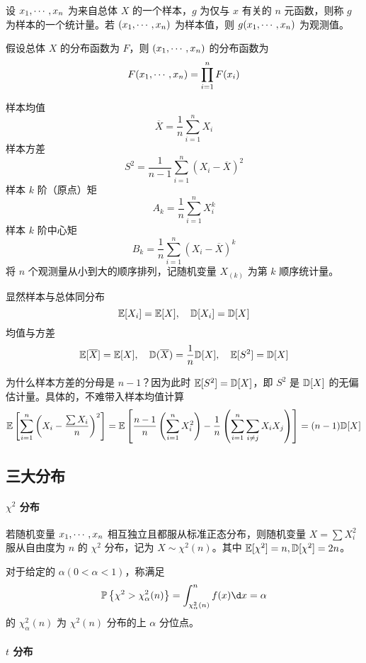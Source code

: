 设 $x_1,\cdots,x_n$ 为来自总体 $X$ 的一个样本，$g$ 为仅与 $x$ 有关的 $n$ 元函数，则称 $g$ 为样本的一个统计量。若 $(x_1,\cdots,x_n)$ 为样本值，则 $g(x_1,\cdots,x_n)$ 为观测值。

假设总体 $X$ 的分布函数为 $F$，则 $(x_1,\cdots,x_n)$ 的分布函数为
\[ F(x_1,\cdots,x_n) = \prod_{i=1}^n F(x_i) \]

样本均值
\[ \overline{X} = \frac{1}{n} \sum_{i=1}^n X_i \]
样本方差
\[ S^2 = \frac{1}{n-1} \sum_{i=1}^n (X_i - \overline{X})^2 \]
样本 $k$ 阶（原点）矩
\[ A_k = \frac{1}{n} \sum_{i=1}^n X_i^k \]
样本 $k$ 阶中心矩
\[ B_k = \frac{1}{n} \sum_{i=1}^n (X_i - \overline{X})^k \]
将 $n$ 个观测量从小到大的顺序排列，记随机变量 $X_{(k)}$ 为第 $k$ 顺序统计量。

显然样本与总体同分布
\[ \mathbb{E}[X_i] = \mathbb{E} [X], \quad \mathbb{D}[X_i] = \mathbb{D}[X] \]
均值与方差
\[ \mathbb{E}[\overline{X}] = \mathbb{E} [X], \quad \mathbb{D}(\overline{X}) = \frac{1}{n} \mathbb{D} [X], \quad \mathbb{E}[S^2] = \mathbb{D} [X]  \]

\begin{note}
	为什么样本方差的分母是 $n-1$？因为此时 $\mathbb{E}[S^2] = \mathbb{D} [X]$，即 $S^2$ 是 $\mathbb{D}[X]$ 的无偏估计量。具体的，不难带入样本均值计算
	\[ \mathbb{E}\left[\sum_{i=1}^n \left(X_i - \frac{\sum X_i}{n}\right)^2\right]
		= \mathbb{E}\left[  \frac{n-1}{n} \left(\sum_{i=1}^n X_i^2\right) - \frac{1}{n}
			\left(\sum_{i=1}^{n} \sum_{i \neq j} X_iX_j\right) \right]
		= (n-1) \mathbb{D}[X] \]
\end{note}

\subsection{三大分布}

\paragraph{$\chi^2$ 分布}

若随机变量 $x_1,\cdots,x_n$ 相互独立且都服从标准正态分布，则随机变量 $X = \sum X_i^2$ 服从自由度为 $n$ 的 $\chi^2$ 分布，记为 $X \sim \chi^2(n)$。其中 $\mathbb{E}[\chi^2] = n, \mathbb{D}[\chi^2] = 2n$。

对于给定的 $\alpha(0 < \alpha < 1)$，称满足
\[ \bbP\left\{\chi^2 > \chi_\alpha^2(n)\right\} = \int_{\chi_\alpha^2(n)}^n f(x) \d x = \alpha  \]
的 $\chi_\alpha^2(n)$ 为 $\chi^2(n)$ 分布的上 $\alpha$ 分位点。

\paragraph{$t$ 分布}

